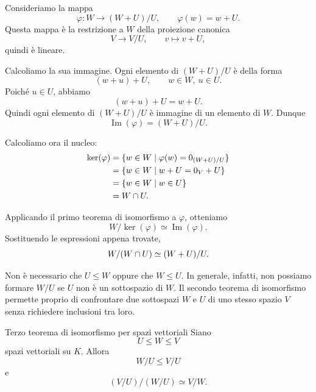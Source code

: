 \documentclass[a4paper]{article}
\begin{document}
\begin{radioactive}
\begin{snippetproof}{}
    Consideriamo la mappa
    \[
        \varphi \colon W \to (W+U)/U,
        \qquad
        \varphi(w)=w+U.
    \]
    Questa mappa è la restrizione a \(W\) della proiezione canonica
    \[
        V \to V/U,
        \qquad
        v \mapsto v+U,
    \]
    quindi è lineare.

    Calcoliamo la sua immagine.
    Ogni elemento di \((W+U)/U\) è della forma
    \[
        (w+u)+U,
        \qquad
        w \in W,\ u \in U.
    \]
    Poiché \(u \in U\), abbiamo
    \[
        (w+u)+U=w+U.
    \]
    Quindi ogni elemento di \((W+U)/U\) è immagine di un elemento di \(W\).
    Dunque
    \[
        \operatorname{Im}(\varphi)=(W+U)/U.
    \]

    Calcoliamo ora il nucleo:
    \begin{align*}
        \ker(\varphi)
        &=
        \{w \in W \mid \varphi(w)=0_{(W+U)/U}\} \\
        &=
        \{w \in W \mid w+U=0_V+U\} \\
        &=
        \{w \in W \mid w \in U\} \\
        &=
        W \cap U.
    \end{align*}

    Applicando il primo teorema di isomorfismo a \(\varphi\), otteniamo
    \[
        W/\ker(\varphi)
        \simeq
        \operatorname{Im}(\varphi).
    \]
    Sostituendo le espressioni appena trovate,
    \[
        W/(W \cap U)
        \simeq
        (W+U)/U.
    \]
\end{snippetproof}
\end{radioactive}

\begin{radioactive}
Non è necessario che \(U \leq W\) oppure che \(W \leq U\).
In generale, infatti, non possiamo formare \(W/U\) se \(U\) non è un sottospazio di \(W\).
Il secondo teorema di isomorfismo permette proprio di confrontare due sottospazi \(W\) e \(U\) di uno stesso spazio \(V\) senza richiedere inclusioni tra loro.
\end{radioactive}

\begin{radioactive}
\begin{snippettheorem}{Terzo teorema di isomorfismo per spazi vettoriali}
    Siano
    \[
        U \leq W \leq V
    \]
    spazi vettoriali su \(K\).
    Allora
    \[
        W/U \leq V/U
    \]
    e
    \[
        (V/U)/(W/U)
        \simeq
        V/W.
    \]
\end{snippettheorem}
\end{radioactive}
\end{document}
